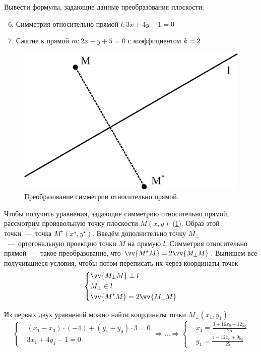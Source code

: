 \documentclass[a4paper,12pt]{article}
\begin{document}
  Вывести формулы, задающие данные преобразования плоскости:
  \begin{enumerate}
    \setcounter{enumi}{5}
    
    \item Симметрия относительно прямой $l\colon 3x + 4y - 1 = 0$
    
    \setcounter{enumi}{7}
    
    \item Сжатие к прямой $m\colon 2x - y + 5 = 0$ с коэффициентом $k \hm= 2$
  \end{enumerate}
  
  \begin{solution}
    \begin{figure}
      \centering
      
      \includegraphics[width=0.5\columnwidth]{simmetria-linea}
      
      \caption{Преобразование симметрии относительно прямой.}
      \label{fig:simmetria-linea}
    \end{figure}
    
    Чтобы получить уравнения, задающие симметрию относительно прямой, рассмотрим произвольную точку плоскости $M(x, y)$ (\ref{fig:simmetria-linea}).
    Образ этой точки~---~точка $M^\star(x^\star, y^\star)$.
    Введём дополнительно точку $M_\perp$~---~ортогональную проекцию точки $M$ на прямую $l$.
    Симметрия относительно прямой~---~такое преобразование, что $\vv{M^\star M} \hm= 2 \vv{M_\perp M}$.
    Выпишем все получившиеся условия, чтобы потом переписать их через координаты точек
    \[
      \left\{
        \begin{aligned}
          &\vv{M_\perp M} \perp l\\
          &M_\perp \in l\\
          &\vv{M^\star M} = 2 \vv{M_\perp M}
        \end{aligned}
      \right.
    \]
    
    Из первых двух уравнений можно найти координаты точки $M_\perp(x_1, y_1)$:
    \[
      \left\{
        \begin{aligned}
          &(x_1 - x_0) \cdot (-4) + (y_1 - y_0) \cdot 3 = 0\\
          &3x_1 + 4y_1 - 1 = 0
        \end{aligned}
      \right.
      \Rightarrow \ldots
      \Rightarrow \left\{
        \begin{aligned}
          &x_1 = \frac{3 + 16x_0 - 12y_0}{25}\\
          &y_1 = \frac{4 - 12x_0 + 9y_0}{25}
        \end{aligned}
      \right.
    \]
    

\end{solution}
\end{document}
